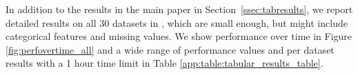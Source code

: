 \documentclass{article}
\begin{document}
In addition to the results in the main paper in Section~\ref{ssec:tabresults}, we report detailed results on all $30$ datasets in \openmlcc{}, which are small enough, but might include categorical features and missing values. We show performance over time in Figure \ref{fig:perfovertime_all} and a wide range of performance values and per dataset results with a 1 hour time limit in Table \ref{app:table:tabular_results_table}.%

%     
\end{document}
